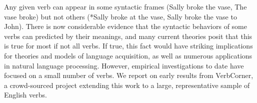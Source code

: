 Any given verb can appear in some syntactic frames (Sally broke the vase, The vase broke) but not others (*Sally broke at the vase, Sally broke the vase to John). There is now considerable evidence that the syntactic behaviors of some verbs can predicted by their meanings, and many current theories posit that this is true for most if not all verbs. If true, this fact would have striking implications for theories and models of language acquisition, as well as numerous applications in natural language processing. However, empirical investigations to date have focused on a small number of verbs. We report on early results from VerbCorner, a crowd-sourced project extending this work to a large, representative sample of English verbs.
